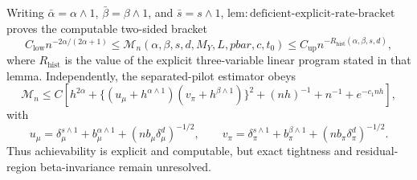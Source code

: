 Writing \(\bar\alpha=\alpha\wedge1\), \(\bar\beta=\beta\wedge1\), and \(\bar s=s\wedge1\), \(\mathrm{lem:deficient\text{-}explicit\text{-}rate\text{-}bracket}\) proves the computable two-sided bracket
\[
C_{\mathrm{low}}n^{-2\alpha/(2\alpha+1)}
\le \mathcal M_n(\alpha,\beta,s,d,M_Y,L,pbar,c,t_0)
\le C_{\mathrm{up}}n^{-R_{\mathrm{hist}}(\alpha,\beta,s,d)},
\]
where \(R_{\mathrm{hist}}\) is the value of the explicit three-variable linear program stated in that lemma. Independently, the separated-pilot estimator obeys
\[
\mathcal M_n\le C\left[h^{2\alpha}+\{(u_\mu+h^{\alpha\wedge1})(v_\pi+h^{\beta\wedge1})\}^2+(nh)^{-1}+n^{-1}+e^{-c_1nh}\right],
\]
with
\[
u_\mu=\delta_\mu^{s\wedge1}+b_\mu^{\alpha\wedge1}+(nb_\mu\delta_\mu^d)^{-1/2},
\qquad
v_\pi=\delta_\pi^{s\wedge1}+b_\pi^{\beta\wedge1}+(nb_\pi\delta_\pi^d)^{-1/2}.
\]
Thus achievability is explicit and computable, but exact tightness and residual-region beta-invariance remain unresolved.
